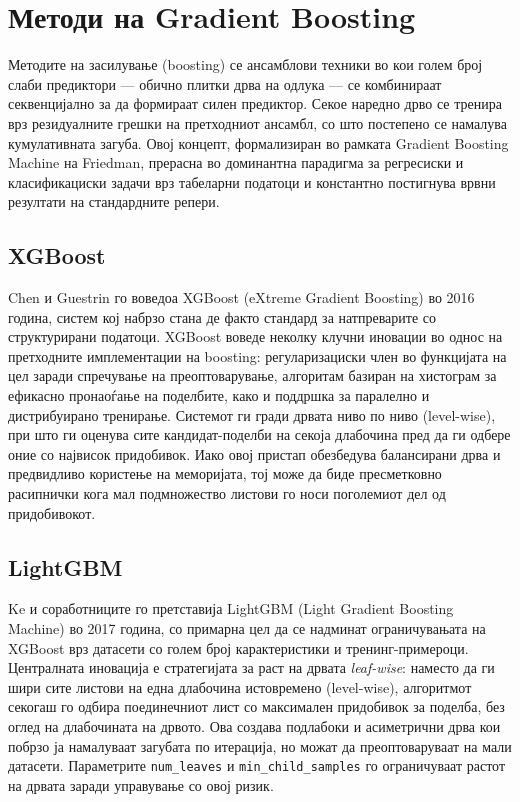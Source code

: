 
\section{Методи на Gradient Boosting}

Методите на засилување (boosting) се ансамблови техники во кои голем број слаби предиктори — обично плитки дрва на одлука — се комбинираат секвенцијално за да формираат силен предиктор. Секое наредно дрво се тренира врз резидуалните грешки на претходниот ансамбл, со што постепено се намалува кумулативната загуба. Овој концепт, формализиран во рамката Gradient Boosting Machine на Friedman, прерасна во доминантна парадигма за регресиски и класификациски задачи врз табеларни податоци и константно постигнува врвни резултати на стандардните репери.

\subsection{XGBoost}

Chen и Guestrin \cite{chen2016xgboost} го воведоа XGBoost (eXtreme Gradient Boosting) во 2016 година, систем кој набрзо стана де факто стандард за натпреварите со структурирани податоци. XGBoost воведе неколку клучни иновации во однос на претходните имплементации на boosting: регуларизациски член во функцијата на цел заради спречување на преоптоварување, алгоритам базиран на хистограм за ефикасно пронаоѓање на поделбите, како и поддршка за паралелно и дистрибуирано тренирање. Системот ги гради дрвата ниво по ниво (level-wise), при што ги оценува сите кандидат-поделби на секоја длабочина пред да ги одбере оние со највисок придобивок. Иако овој пристап обезбедува балансирани дрва и предвидливо користење на меморијата, тој може да биде пресметковно расипнички кога мал подмножество листови го носи поголемиот дел од придобивокот.

\subsection{LightGBM}

Ke и соработниците \cite{ke2017lightgbm} го претставија LightGBM (Light Gradient Boosting Machine) во 2017 година, со примарна цел да се надминат ограничувањата на XGBoost врз датасети со голем број карактеристики и тренинг-примероци. Централната иновација е стратегијата за раст на дрвата \textit{leaf-wise}: наместо да ги шири сите листови на една длабочина истовремено (level-wise), алгоритмот секогаш го одбира поединечниот лист со максимален придобивок за поделба, без оглед на длабочината на дрвото. Ова создава подлабоки и асиметрични дрва кои побрзо ја намалуваат загубата по итерација, но можат да преоптоваруваат на мали датасети. Параметрите \texttt{num\_leaves} и \texttt{min\_child\_samples} го ограничуваат растот на дрвата заради управување со овој ризик.

